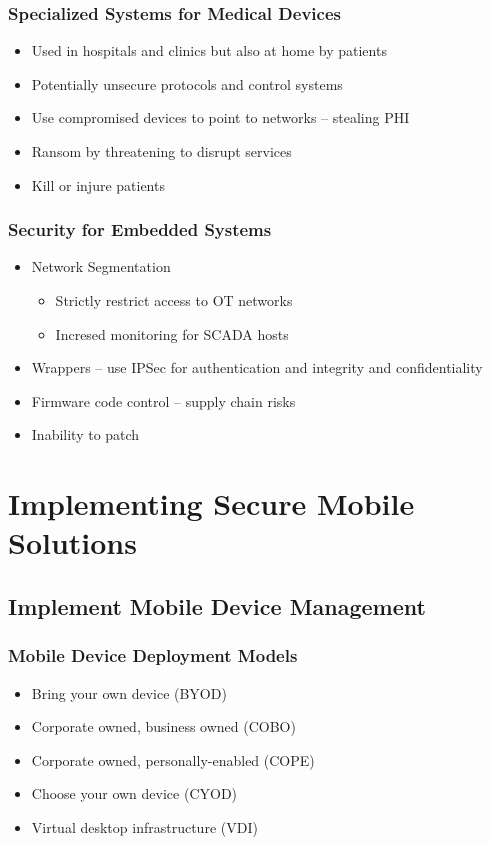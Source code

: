 		\subsubsection {Specialized Systems for Medical Devices}
			\begin{itemize}
				\item Used in hospitals and clinics but also at home by patients
				\item Potentially unsecure protocols and control systems
				\item Use compromised devices to point to networks -- stealing PHI
				\item Ransom by threatening to disrupt services
				\item Kill or injure patients
			\end{itemize}
		\subsubsection {Security for Embedded Systems}
			\begin{itemize}
				\item Network Segmentation
					\begin{itemize}
						\item Strictly restrict access to OT networks
						\item Incresed monitoring for SCADA hosts
					\end{itemize}
				\item Wrappers -- use IPSec for authentication and integrity and
					confidentiality
				\item Firmware code control -- supply chain risks
				\item Inability to patch
			\end{itemize}

\section {Implementing Secure Mobile Solutions}
	\subsection {Implement Mobile Device Management}
		\subsubsection {Mobile Device Deployment Models}
			\begin{itemize}
				\item Bring your own device (BYOD)
				\item Corporate owned, business owned (COBO)
				\item Corporate owned, personally-enabled (COPE)
				\item Choose your own device (CYOD)
				\item Virtual desktop infrastructure (VDI)
			\end{itemize}
